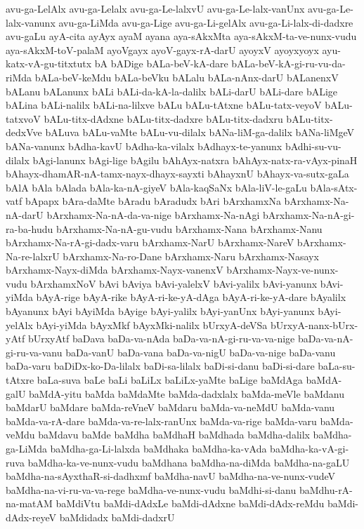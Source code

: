 {avu-ga-LelAlx
avu-ga-Lelalx
avu-ga-Le-lalxvU
avu-ga-Le-lalx-vanUnx
avu-ga-Le-lalx-vanunx
avu-ga-LiMda
avu-ga-Lige
avu-ga-Li-gelAlx
avu-ga-Li-lalx-di-dadxre
avu-gaLu
ayA-cita
ayAyx
ayaM
ayana
aya-sAkxMta
aya-sAkxM-ta-ve-nunx-vudu
aya-sAkxM-toV-palaM
ayoVgayx
ayoV-gayx-rA-darU
ayoyxV
ayoyxyoyx
ayu-katx-vA-gu-titxtutx
bA
bADige
bALa-beV-kA-dare
bALa-beV-kA-gi-ru-vu-da-riMda
bALa-beV-keMdu
bALa-beVku
bALalu
bALa-nAnx-darU
bALanenxV
bALanu
bALanunx
bALi
bALi-da-kA-la-dalilx
bALi-darU
bALi-dare
bALige
bALina
bALi-nalilx
bALi-na-lilxve
bALu
bALu-tAtxne
bALu-tatx-veyoV
bALu-tatxvoV
bALu-titx-dAdxne
bALu-titx-dadxre
bALu-titx-dadxru
bALu-titx-dedxVve
bALuva
bALu-vaMte
bALu-vu-dilalx
bANa-liM-ga-dalilx
bANa-liMgeV
bANa-vanunx
bAdha-kavU
bAdha-ka-vilalx
bAdhayx-te-yanunx
bAdhi-su-vu-dilalx
bAgi-lanunx
bAgi-lige
bAgilu
bAhAyx-natxra
bAhAyx-natx-ra-vAyx-pinaH
bAhayx-dhamAR-nA-tamx-nayx-dhayx-sayxti
bAhayxnU
bAhayx-va-sutx-gaLa
bAlA
bAla
bAlada
bAla-ka-nA-giyeV
bAla-kaqSaNx
bAla-liV-le-gaLu
bAla-sAtx-vatf
bApapx
bAra-daMte
bAradu
bAradudx
bAri
bArxhamxNa
bArxhamx-Na-nA-darU
bArxhamx-Na-nA-da-va-nige
bArxhamx-Na-nAgi
bArxhamx-Na-nA-gi-ra-ba-hudu
bArxhamx-Na-nA-gu-vudu
bArxhamx-Nana
bArxhamx-Nanu
bArxhamx-Na-rA-gi-dadx-varu
bArxhamx-NarU
bArxhamx-NareV
bArxhamx-Na-re-lalxrU
bArxhamx-Na-ro-Dane
bArxhamx-Naru
bArxhamx-Nasayx
bArxhamx-Nayx-diMda
bArxhamx-Nayx-vanenxV
bArxhamx-Nayx-ve-nunx-vudu
bArxhamxNoV
bAvi
bAviya
bAvi-yalelxV
bAvi-yalilx
bAvi-yanunx
bAvi-yiMda
bAyA-rige
bAyA-rike
bAyA-ri-ke-yA-dAga
bAyA-ri-ke-yA-dare
bAyalilx
bAyanunx
bAyi
bAyiMda
bAyige
bAyi-yalilx
bAyi-yanUnx
bAyi-yanunx
bAyi-yelAlx
bAyi-yiMda
bAyxMkf
bAyxMki-nalilx
bUrxyA-deVSa
bUrxyA-nanx-bUrx-yAtf
bUrxyAtf
baDava
baDa-va-nAda
baDa-va-nA-gi-ru-va-va-nige
baDa-va-nA-gi-ru-va-vanu
baDa-vanU
baDa-vana
baDa-va-nigU
baDa-va-nige
baDa-vanu
baDa-varu
baDiDx-ko-Da-lilalx
baDi-sa-lilalx
baDi-si-danu
baDi-si-dare
baLa-su-tAtxre
baLa-suva
baLe
baLi
baLiLx
baLiLx-yaMte
baLige
baMdAga
baMdA-galU
baMdA-yitu
baMda
baMdaMte
baMda-dadxlalx
baMda-meVle
baMdanu
baMdarU
baMdare
baMda-reVneV
baMdaru
baMda-va-neMdU
baMda-vanu
baMda-va-rA-dare
baMda-va-re-lalx-ranUnx
baMda-va-rige
baMda-varu
baMda-veMdu
baMdavu
baMde
baMdha
baMdhaH
baMdhada
baMdha-dalilx
baMdha-ga-LiMda
baMdha-ga-Li-lalxda
baMdhaka
baMdha-ka-vAda
baMdha-ka-vA-gi-ruva
baMdha-ka-ve-nunx-vudu
baMdhana
baMdha-na-diMda
baMdha-na-gaLU
baMdha-na-sAyxthaR-si-dadhxmf
baMdha-navU
baMdha-na-ve-nunx-vudeV
baMdha-na-vi-ru-va-va-rege
baMdha-ve-nunx-vudu
baMdhi-si-danu
baMdhu-rA-na-matAM
baMdiVtu
baMdi-dAdxLe
baMdi-dAdxne
baMdi-dAdx-reMdu
baMdi-dAdx-reyeV
baMdidadx
baMdi-dadxrU
}
